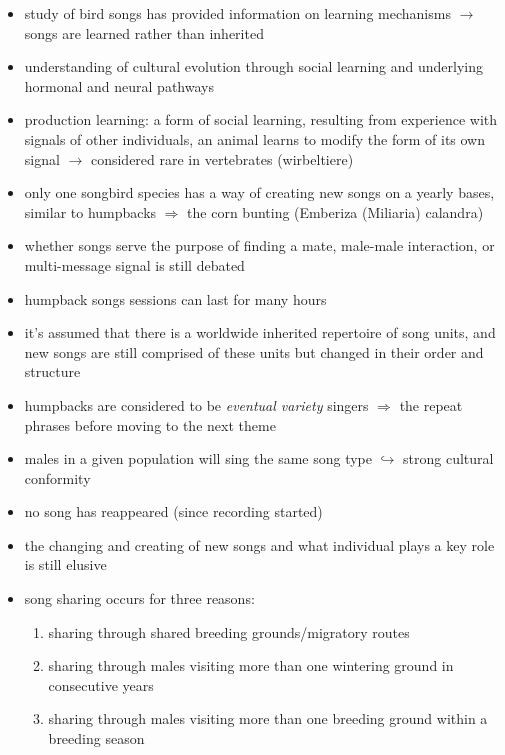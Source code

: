 \documentclass[12pt,a4paper]{article}
\begin{document}
\begin{itemize}
  \item study of bird songs has provided information on learning mechanisms \cite{garland_cultural_2020}
  \newline \indent $\longrightarrow$ songs are learned rather than inherited
  \item understanding of cultural evolution through social learning and underlying hormonal and neural pathways
  \item production learning: a form of social learning, resulting from experience with signals of other individuals, an animal learns to modify the form of its own signal
  \newline \indent $\longrightarrow$ considered rare in vertebrates (wirbeltiere)
  \item only one songbird species has a way of creating new songs on a yearly bases, similar to humpbacks $\Longrightarrow$ the corn bunting (Emberiza (Miliaria) calandra)
  \item whether songs serve the purpose of finding a mate, male-male interaction, or multi-message signal is still debated
  \item humpback songs sessions can last for many hours
  \item it's assumed that there is a worldwide inherited repertoire of song units, and new songs are still comprised of these units but changed in their order and structure
  \item humpbacks are considered to be \textit{eventual variety} singers $\Longrightarrow$ the repeat phrases before moving to the next theme
  \item males in a given population will sing the same song type
  \newline \indent $\hookrightarrow$ strong cultural conformity
  \item no song has reappeared (since recording started)
  \item the changing and creating of new songs and what individual plays a key role is still elusive
  \item song sharing occurs for three reasons:
  \begin{enumerate}
     \item sharing through shared breeding grounds/migratory routes
     \item sharing through males visiting more than one wintering ground in consecutive years
     \item sharing through males visiting more than one breeding ground within a breeding season

\end{enumerate}
\end{itemize}
\end{document}

